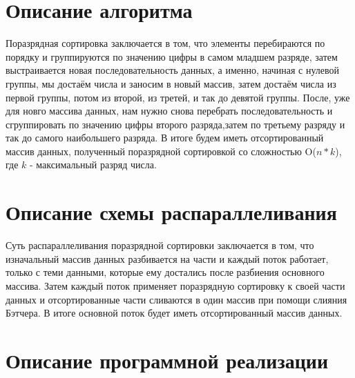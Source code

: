 \documentclass{report}
\begin{document}
\section*{Описание алгоритма}
\par Поразрядная сортировка заключается в том, что элементы перебираются по порядку и группируются по значению цифры в самом младшем разряде, затем выстраивается новая последовательность данных, а именно, начиная с нулевой группы, мы достаём числа и заносим в новый массив, затем достаём числа из первой группы, потом из второй, из третей, и так до девятой группы. После, уже для новго массива данных, нам нужно снова перебрать последовательность и сгруппировать по значению цифры второго разряда,затем по третьему разряду и так до самого наибольшего разряда. В итоге будем иметь отсортированный массив данных, полученный поразрядной сортировкой со сложностью O($n*k$), где $k$ - максимальный разряд числа.
\newpage

\section*{Описание схемы распараллеливания}
\par Суть распараллеливания поразрядной сортировки заключается в том, что изначальный массив данных разбивается на части и каждый поток работает, только с теми данными, которые ему достались после разбиения основного массива. Затем каждый поток применяет поразрядную сортировку к своей части данных и отсортированные части сливаются в один массив при помощи слияния Бэтчера. В итоге основной поток будет иметь отсортированный массив данных.
\newpage

\section*{Описание программной реализации}
\end{document}
